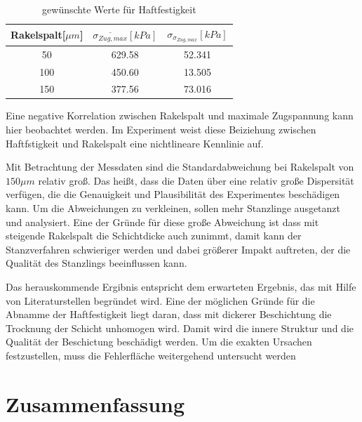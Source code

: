 \documentclass[12pt,UTF8]{article}
\begin{document}
\begin{table}[H]
    \centering
    \caption{gew\"unschte Werte f\"ur Haftfestigkeit}
    \begin{tabular}{ccc}
        \midrule
        Rakelspalt[$\mu m$] & $\overline{\sigma_{Zug,max}}[kPa]$ & $\sigma_{\sigma_{Zug,max}}[kPa]$ \\
        \toprule
        50                  & 629.58                             & 52.341                           \\
        100                 & 450.60                             & 13.505                           \\
        150                 & 377.56                             & 73.016                           \\
        \midrule
    \end{tabular}
\end{table}
Eine negative Korrelation zwischen Rakelspalt und maximale Zugspannung kann hier beobachtet werden. Im Experiment weist diese Beiziehung zwischen Haftfstigkeit und Rakelspalt eine nichtlineare Kennlinie auf.

Mit Betrachtung der Messdaten sind die Standardabweichung bei Rakelspalt von $150\mu m$ relativ groß. Das heißt, dass die Daten über eine relativ große Dispersität verfügen, die die Genauigkeit und Plausibilität des Experimentes beschädigen kann. Um die Abweichungen zu verkleinen, sollen mehr Stanzlinge ausgetanzt und analysiert. Eine der Gründe für diese große Abweichung ist dass mit steigende Rakelspalt die Schichtdicke auch zunimmt, damit kann der Stanzverfahren schwieriger werden und dabei größerer Impakt auftreten, der die Qualität des Stanzlings beeinflussen kann.

Das herauskommende Ergibnis entspricht dem erwarteten Ergebnis, das mit Hilfe von Literaturstellen begründet wird. Eine der möglichen Gründe für die Abnamme der Haftfestigkeit liegt daran, dass mit dickerer Beschichtung die Trocknung der Schicht unhomogen wird. Damit wird die innere Struktur und die Qualität der Beschictung beschädigt werden. Um die exakten Ursachen festzustellen, muss die Fehlerfläche weitergehend untersucht werden

\newpage

\part{Zusammenfassung}

\newpage

\clearpage
\renewcommand\refname{Literaturverzeichnis}

\newpage
\end{document}

